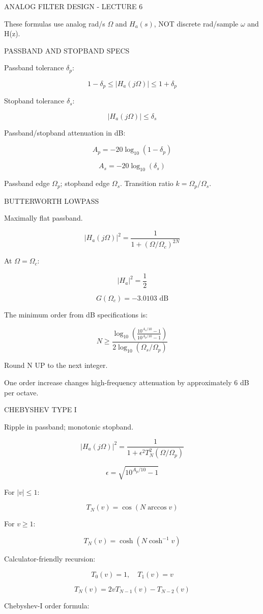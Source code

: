 ANALOG FILTER DESIGN - LECTURE 6

These formulas use analog rad/s $\Omega$ and $H_a(s)$, NOT discrete rad/sample $\omega$ and H(z).

PASSBAND AND STOPBAND SPECS

Passband tolerance $\delta_p$:

$$1-\delta_p\le |H_a(j\Omega)|\le1+\delta_p$$

Stopband tolerance $\delta_s$:

$$|H_a(j\Omega)|\le\delta_s$$

Passband/stopband attenuation in dB:

$$A_p=-20\log_{10}(1-\delta_p)$$

$$A_s=-20\log_{10}(\delta_s)$$

Passband edge $\Omega_p$; stopband edge $\Omega_s$. Transition ratio $k=\Omega_p/\Omega_s$.

BUTTERWORTH LOWPASS

Maximally flat passband.

$$|H_a(j\Omega)|^2=\frac{1}{1+(\Omega/\Omega_c)^{2N}}$$

At $\Omega=\Omega_c$:

$$|H_a|^2=\frac12$$

$$G(\Omega_c)=-3.0103\text{ dB}$$

The minimum order from dB specifications is:

$$N\ge\frac{\log_{10}\left(\frac{10^{A_s/10}-1}{10^{A_p/10}-1}\right)}{2\log_{10}(\Omega_s/\Omega_p)}$$

Round N UP to the next integer.

One order increase changes high-frequency attenuation by approximately 6 dB per octave.

CHEBYSHEV TYPE I

Ripple in passband; monotonic stopband.

$$|H_a(j\Omega)|^2=\frac{1}{1+\epsilon^2T_N^2(\Omega/\Omega_p)}$$

$$\epsilon=\sqrt{10^{A_p/10}-1}$$

For $|v|\le1$:

$$T_N(v)=\cos(N\arccos v)$$

For $v\ge1$:

$$T_N(v)=\cosh(N\cosh^{-1}v)$$

Calculator-friendly recursion:

$$T_0(v)=1,\quad T_1(v)=v$$

$$T_N(v)=2vT_{N-1}(v)-T_{N-2}(v)$$

Chebyshev-I order formula:

